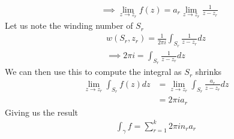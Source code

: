 \documentclass{article}
\begin{document}
\begin{enumerate}
\begin{align*}
        &\implies \lim_{z\to z_r}f(z)=a_r\lim_{z\to z_r}\frac{1}{z-z_r}
      \end{align*}
      Let us note the winding number of $S_r$
      \begin{align*}
        w(S_r,z_r)=\frac{1}{2\pi i}\int_{S_r}\frac{1}{z-z_r}dz\\
        \implies 2\pi i=\int_{S_r}\frac{1}{z-z_r}dz
      \end{align*}
      We can then use this to compute the integral as $S_r$ shrinks
      \begin{align*}
        \lim_{z\to z_r}\int_{S_r}f(z)dz&=\lim_{z\to z_r}\int_{S_r}\frac{a_r}{z-z_r}dz\\
        &=2\pi ia_r
      \end{align*}
      Giving us the result
      \begin{align*}
        \int_\gamma f=\sum_{r=1}^k2\pi in_ra_r
      \end{align*}
  \end{enumerate}
\end{document}
